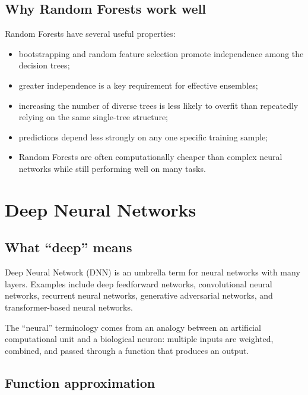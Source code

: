 \documentclass[11pt,a4paper]{report}
\begin{document}
\subsection{Why Random Forests work well}

Random Forests have several useful properties:
\begin{itemize}
  \item bootstrapping and random feature selection promote independence among the decision trees;
  \item greater independence is a key requirement for effective ensembles;
  \item increasing the number of diverse trees is less likely to overfit than repeatedly relying on the same single-tree structure;
  \item predictions depend less strongly on any one specific training sample;
  \item Random Forests are often computationally cheaper than complex neural networks while still performing well on many tasks.
\end{itemize}

\section{Deep Neural Networks}

\subsection{What ``deep'' means}

Deep Neural Network (DNN) is an umbrella term for neural networks with many layers. Examples include deep feedforward networks, convolutional neural networks, recurrent neural networks, generative adversarial networks, and transformer-based neural networks.

The ``neural'' terminology comes from an analogy between an artificial computational unit and a biological neuron: multiple inputs are weighted, combined, and passed through a function that produces an output.

\subsection{Function approximation}
\end{document}

